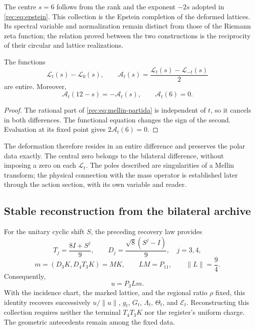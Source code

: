 The centre \(s=6\) follows from the rank and the exponent \(-2s\) adopted in \eqref{rec:eq:epstein}. This collection is the Epstein completion of the deformed lattices. Its spectral variable and normalization remain distinct from those of the Riemann zeta function; the relation proved between the two constructions is the reciprocity of their circular and lattice realizations.

\begin{corollary}
\label{rec:cor:polar}
The functions
\[
 \mathcal L_t(s)-\mathcal L_0(s),\qquad
 \mathcal A_t(s)=\frac{\mathcal L_t(s)-\mathcal L_{-t}(s)}2
\]
are entire. Moreover,
\[
 \mathcal A_t(12-s)=-\mathcal A_t(s),\qquad \mathcal A_t(6)=0.
\]
\end{corollary}
\begin{proof}
The rational part of \eqref{rec:eq:mellin-partida} is independent of \(t\), so it cancels in both differences. The functional equation changes the sign of the second. Evaluation at its fixed point gives \(2\mathcal A_t(6)=0\).
\end{proof}

The deformation therefore resides in an entire difference and preserves the polar data exactly. The central zero belongs to the bilateral difference, without imposing a zero on each \(\mathcal L_t\). The poles described are singularities of a Mellin transform; the physical connection with the mass operator is established later through the action section, with its own variable and reader.

\subsection{Stable reconstruction from the bilateral archive}
\label{rec:archivo}

For the unitary cyclic shift \(S\), the preceding recovery law provides
\[
 T_j=\frac{8I+S^j}{9},\qquad D_j=\frac{\sqrt8(S^j-I)}9,
 \quad j=3,4,
\]
\begin{equation}
 m=(D_3K,D_4T_3K)=MK,\qquad LM=P_{11},\qquad\|L\|=\frac94.
 \label{rec:eq:archivo}
\end{equation}
Consequently,
\begin{equation}
 u=P_3Lm.
 \label{rec:eq:recuperacion-u}
\end{equation}
With the incidence chart, the marked lattice, and the regional ratio \(\rho\) fixed, this identity recovers successively \(u/\|u\|\), \(g_t\), \(G_t\), \(\Lambda_t\), \(\Theta_t\), and \(\mathcal E_t\). Reconstructing this collection requires neither the terminal \(T_4T_3K\) nor the register's uniform charge. The geometric antecedents remain among the fixed data.

